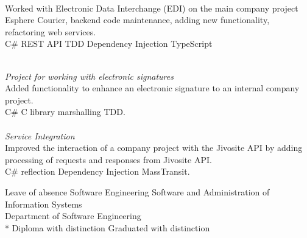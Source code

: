 \documentclass[
	a4paper,
]{fortysecondscv}
\begin{document}
\begin{cvtable}[1.5]
    {\\
     Worked with Electronic Data Interchange (\colorbox{cvsidecolor}{EDI}) on the main company project Esphere Courier, backend code maintenance, adding new functionality, refactoring web services.
     \\ \colorbox{cvsidecolor}{C\#}
     \colorbox{cvsidecolor}{REST API}
     \colorbox{cvsidecolor}{TDD}
     \colorbox{cvsidecolor}{Dependency Injection}
     \colorbox{cvsidecolor}{TypeScript}
    }

\end{cvtable}

\begin{cvtable}[1.5]

	{\\ \emph{Project for working with electronic signatures} \\
    Added functionality to enhance an electronic signature to an internal company project.
    \\ \colorbox{cvsidecolor}{C\#} 
    \colorbox{cvsidecolor}{C library} \colorbox{cvsidecolor}{marshalling}
    \colorbox{cvsidecolor}{TDD}. \\ \\
     \emph{Service Integration} \\
     Improved the interaction of a company project with the Jivosite API by adding processing of requests and responses from Jivosite API. 
     \\ \colorbox{cvsidecolor}{C\#} 
     \colorbox{cvsidecolor}{reflection} \colorbox{cvsidecolor}{Dependency Injection} \colorbox{cvsidecolor}{MassTransit}.
    }

\end{cvtable}



\begin{cvtable}[1.5]
	{Leave of absence}
	{ Software Engineering }
	{Software and Administration of Information Systems
		\\ Department of Software Engineering \\
	  * Diploma with distinction
	}
	{ Graduated with distinction}
\end{cvtable}
\end{document}

